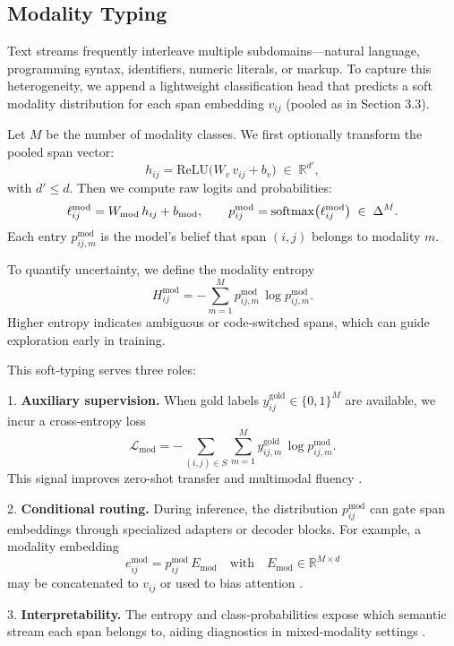 \subsection{Modality Typing}

Text streams frequently interleave multiple subdomains—natural language, programming syntax, identifiers, numeric literals, or markup. To capture this heterogeneity, we append a lightweight classification head that predicts a soft modality distribution for each span embedding \(v_{ij}\) (pooled as in Section 3.3).

Let \(M\) be the number of modality classes. We first optionally transform the pooled span vector:
\[
h_{ij} = \mathrm{ReLU}\bigl(W_v\,v_{ij} + b_v\bigr)\;\in\;\mathbb{R}^{d'},
\]
with \(d'\le d\).  Then we compute raw logits and probabilities:
\[
\ell^{\mathrm{mod}}_{ij} = W_{\mathrm{mod}}\,h_{ij} + b_{\mathrm{mod}},
\qquad
p^{\mathrm{mod}}_{ij} = \mathrm{softmax}\bigl(\ell^{\mathrm{mod}}_{ij}\bigr)
\;\in\;\Delta^{M}.
\]
Each entry \(p^{\mathrm{mod}}_{ij,m}\) is the model’s belief that span \((i,j)\) belongs to modality \(m\).

To quantify uncertainty, we define the modality entropy
\[
H^{\mathrm{mod}}_{ij}
= -\sum_{m=1}^M
p^{\mathrm{mod}}_{ij,m}\,\log p^{\mathrm{mod}}_{ij,m}.
\]
Higher entropy indicates ambiguous or code-switched spans, which can guide exploration early in training.

This soft‐typing serves three roles:

1. \textbf{Auxiliary supervision.}  
When gold labels \(y^{\mathrm{gold}}_{ij}\in\{0,1\}^M\) are available, we incur a cross‐entropy loss
\[
\mathcal{L}_{\mathrm{mod}}
= -\sum_{(i,j)\in S}
\sum_{m=1}^M
y^{\mathrm{gold}}_{ij,m}\,\log p^{\mathrm{mod}}_{ij,m}.
\]
This signal improves zero-shot transfer and multimodal fluency \cite{khashabi2020unifiedqa, gupta2022molt}.

2. \textbf{Conditional routing.}  
During inference, the distribution \(p^{\mathrm{mod}}_{ij}\) can gate span embeddings through specialized adapters or decoder blocks. For example, a modality embedding
\[
e^{\mathrm{mod}}_{ij}
= p^{\mathrm{mod}}_{ij}\,E_{\mathrm{mod}}
\quad\text{with}\quad
E_{\mathrm{mod}}\in\mathbb{R}^{M\times d}
\]
may be concatenated to \(v_{ij}\) or used to bias attention \cite{li2021prefix}.

3. \textbf{Interpretability.}  
The entropy and class‐probabilities expose which semantic stream each span belongs to, aiding diagnostics in mixed‐modality settings \cite{lin2021codemix, tay2021charformer}.

